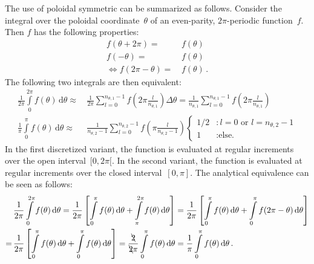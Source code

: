 The use of poloidal symmetric can be summarized as follows.
Consider the integral over the poloidal coordinate~$\theta$ of an even-parity, $2\pi$-periodic function~$f$.
Then $f$ has the following properties:
\begin{align}
  f(\theta + 2 \pi) =&\, f(\theta) \\
  f(- \theta      ) =&\, f(\theta) \\
  \Leftrightarrow
  f(2 \pi - \theta) =&\, f(\theta) \, .
\end{align}
The following two integrals are then equivalent:
\begin{align}
  \frac{1}{2 \pi} \int\limits_0^{2 \pi} f(\theta) \,\mathrm{d}\theta \approx&\, \frac{1}{2 \pi} \sum\limits_{l=0}^{n_{\theta,1}-1} f\left( 2 \pi \frac{l}{n_{\theta,1}  } \right) \Delta \theta
    = \frac{1}{n_{\theta,1}  } \sum\limits_{l=0}^{n_{\theta,1}-1} f\left( 2 \pi \frac{l}{n_{\theta,1}  } \right) \label{eqn:theta_int_full} \\
  \frac{1}{  \pi} \int\limits_0^{  \pi} f(\theta) \,\mathrm{d}\theta \approx&\, \frac{1}{n_{\theta,2}-1} \sum\limits_{l=0}^{n_{\theta,2}-1} f\left(   \pi \frac{l}{n_{\theta,2}-1} \right)
  \begin{cases}
    1/2 &: l=0 \textrm{ or } l=n_{\theta,2}-1 \\
    1   &: \textrm{else.}
  \end{cases}
\end{align}
In the first discretized variant, the function is evaluated at regular increments over the open interval~$[0,2 \pi[$.
In the second variant, the function is evaluated at regular increments over the closed interval~$[0, \pi]$.
The analytical equivalence can be seen as follows:
\begin{align}
  ~&\, \frac{1}{2 \pi} \int\limits_0^{2 \pi} f(\theta) \,\mathrm{d}\theta
  = \frac{1}{2 \pi} \left[ \int\limits_0^{\pi} f(\theta) \,\mathrm{d}\theta + \int\limits_\pi^{2\pi} f(\theta) \,\mathrm{d}\theta \right]
  = \frac{1}{2 \pi} \left[ \int\limits_0^{\pi} f(\theta) \,\mathrm{d}\theta + \int\limits_0^{\pi} f(2 \pi - \theta) \,\mathrm{d}\theta \right] \nonumber \\
  =&\, \frac{1}{2 \pi} \left[ \int\limits_0^{\pi} f(\theta) \,\mathrm{d}\theta + \int\limits_0^{\pi} f(\theta) \,\mathrm{d}\theta \right]
  = \frac{\bcancel{2}}{\bcancel{2} \pi} \int\limits_0^{\pi} f(\theta) \,\mathrm{d}\theta
  = \frac{1}{  \pi} \int\limits_0^{  \pi} f(\theta) \,\mathrm{d}\theta \, .
\end{align}


